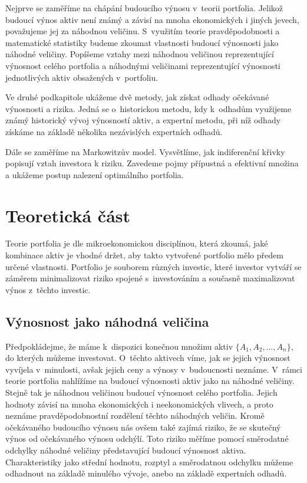 \documentclass[12pt,a4paper]{report}
\begin{document}
Nejprve se zaměříme na chápání budoucího výnosu v~teorii portfolia. Jelikož budoucí výnos aktiv není známý a závisí na mnoha ekonomických i jiných jevech, považujeme jej za náhodnou veličinu. S~využitím teorie pravděpodobnosti a matematické statistiky budeme zkoumat vlastnosti budoucí výnosnosti jako náhodné veličiny. Popíšeme vztahy mezi náhodnou veličinou reprezentující výnosnost celého portfolia a náhodnými veličinami reprezentující výnosnosti jednotlivých aktiv obsažených v~portfoliu.

Ve druhé podkapitole ukážeme dvě metody, jak získat odhady očekávané výnosnosti a rizika. Jedná se o~historickou metodu, kdy k~odhadům využijeme známý historický vývoj výnosností aktiv, a expertní metodu, při níž odhady získáme na základě několika nezávislých expertních odhadů.

Dále se zaměříme na Markowitzův model. Vysvětlíme, jak indiferenční křivky popisují vztah investora k riziku. Zavedeme pojmy přípustná a efektivní množina a ukážeme postup nalezení optimálního portfolia.

 


\chapter{Teoretická část}
Teorie portfolia je dle \cite[str. 1]{camsky} mikroekonomickou disciplínou, která zkoumá, jaké kombinace aktiv je vhodné držet, aby takto vytvořené portfolio mělo předem určené vlastnosti. Portfolio je souborem různých investic, které investor vytváří se záměrem minimalizovat riziko spojené s~investováním a současně maximalizovat výnos z~těchto investic.

\section{Výnosnost jako náhodná veličina}
Předpokládejme, že máme k~dispozici konečnou množinu aktiv $\{A_1,A_2,\dots,A_n\}$, do kterých můžeme investovat. O~těchto aktivech víme, jak se jejich výnosnost vyvíjela v~minulosti, avšak jejich ceny a výnosy v~budoucnosti neznáme. V~rámci teorie portfolia nahlížíme na budoucí výnosnosti aktiv jako na náhodné veličiny. Stejně tak je náhodnou veličinou budoucí výnosnost celého portfolia. Jejich hodnoty závisí na mnoha ekonomických i neekonomických vlivech, a proto neznáme pravděpodobnostní rozdělení těchto náhodných veličin. Kromě očekávaného budoucího výnosu nás ovšem také zajímá riziko, že se skutečný výnos od očekávaného výnosu odchýlí. Toto riziko měříme pomocí směrodatné odchylky náhodné veličiny představující budoucí výnosnost aktiva. Charakteristiky jako střední hodnotu, rozptyl a směrodatnou odchylku můžeme odhadnout na základě minulého vývoje, anebo na základě expertních odhadů.
\end{document}
